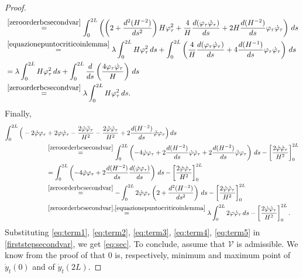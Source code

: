 \documentclass[11pt]{amsart}
\theoremstyle{definition}
\theoremstyle{remark}
\numberwithin{equation}{section}
\begin{document}
\begin{proof}
\begin{equation}
\begin{split}
		&\overset{\eqref{zeroorderbcsecondvar}}{=}\int_{0}^{2L}\left(\left(2+\frac{d^2(H^{-2})}{ds^2}\right)H\varphi_\tau^2+\frac{4}{H}\frac{d(\varphi_\tau\dot\varphi_\tau)}{ds}+ 2H\frac{d(H^{-2})}{ds}\varphi_\tau\dot\varphi_\tau\right)\,ds\\
		&\overset{\eqref{equazionepuntocriticoinlemma}}{=}\lambda\int_{0}^{2L}H\varphi_\tau^2\,ds+\int_{0}^{2L}\left(\frac{4}{H}\frac{d(\varphi_\tau\dot\varphi_\tau)}{ds}+ 4\frac{d(H^{-1})}{ds}\varphi_\tau\dot\varphi_\tau\right)\,ds\\
		&=\lambda\int_{0}^{2L}H\varphi_\tau^2\,ds+\int_{0}^{2L}\frac{d}{ds}\left(\frac{4\varphi_\tau\dot\varphi_\tau}{H}\right)\,ds\\
		&\overset{\eqref{zeroorderbcsecondvar}}{=}\lambda\int_{0}^{2L}H\varphi_\tau^2\,ds.
	\end{split}
\end{equation}
Finally,
\begin{equation}\label{eq:term5}
	\begin{split}
		\int_0^{2L}\Big(-2\dot\varphi\varphi_\tau&+2\varphi\dot\varphi_\tau-\frac{2\dot\varphi\ddot\varphi_\tau}{H^2}-\frac{2\ddot\varphi\dot\varphi_\tau}{H^2}+2\frac{d(H^{-2})}{ds}\ddot\varphi\varphi_\tau\Big)\,ds\\
		&\overset{\eqref{zeroorderbcsecondvar}}{=}\int_0^{2L}\left(-4\dot\varphi\varphi_\tau+2\frac{d(H^{-2})}{ds}\dot\varphi\dot\varphi_\tau+2\frac{d(H^{-2})}{ds}\ddot\varphi\varphi_\tau\right)\,ds-\left[\frac{2\dot\varphi\dot\varphi_\tau}{H^2}\right]_{0}^{2L}\\
		&=\int_0^{2L}\left(-4\dot\varphi\varphi_\tau+2\frac{d(H^{-2})}{ds}\frac{d(\dot\varphi\varphi_\tau)}{ds}\right)\,ds-\left[\frac{2\dot\varphi\dot\varphi_\tau}{H^2}\right]_{0}^{2L}\\
		&\overset{\eqref{zeroorderbcsecondvar}}{=}-\int_0^{2L}2\dot\varphi\varphi_\tau\left(2+\frac{d^2(H^{-2})}{ds^2}\right)\,ds-\left[\frac{2\dot\varphi\dot\varphi_\tau}{H^2}\right]_{0}^{2L}\\
		&\overset{\eqref{zeroorderbcsecondvar},\eqref{equazionepuntocriticoinlemma}}{=}\lambda\int_0^{2L}2\varphi\dot\varphi_\tau\,ds-\left[\frac{2\dot\varphi\dot\varphi_\tau}{H^2}\right]_{0}^{2L}.
	\end{split}
\end{equation}
Substituting \eqref{eq:term1}, \eqref{eq:term2}, \eqref{eq:term3}, \eqref{eq:term4}, \eqref{eq:term5}  in \eqref{firststepsecondvar}, we get \eqref{eq:sec}. To conclude, assume that $\mathcal V$ is admissible. We know from the proof of  that $0$ is, respectively, minimum and maximum point of $\dot y_t(0)$ and of $\dot y_t(2L)$. 

\end{proof}
\end{document}
